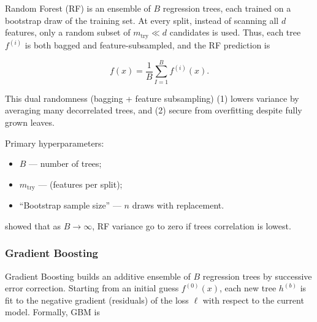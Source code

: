 Random Forest (RF) is an ensemble of \(B\) regression trees\cite{breimanRandomForests2001}, each trained on a bootstrap draw of the training set. At every split, instead of scanning all \(d\) features, only a random subset of \(m_{\mathrm{try}}\ll d\) candidates is used. Thus, each tree \(f^{(i)}\) is both bagged and feature-subsampled, and the RF prediction is

\begin{equation}
    f(x)
    =
    \frac{1}{B}\sum_{I=1}^B f^{(i)}(x).
\end{equation}

This dual randomness (bagging + feature subsampling) (1) lowers variance by averaging many decorrelated trees, and (2) secure from overfitting despite fully grown leaves.

Primary hyperparameters:
\begin{itemize}
    \item \(B\) --- number of trees;
    \item \(m_{\mathrm{try}}\) --- (features per split);
    \item ``Bootstrap sample size'' --- \(n\) draws with replacement.
\end{itemize}

\cite{breimanRandomForests2001} showed that as \(B \to \infty\), RF variance go to zero if trees correlation is lowest.


\subsubsection{Gradient Boosting}
\label{model:gradient-boosting}

Gradient Boosting \cite{friedmanGreedyFunctionApproximation2001} builds an additive ensemble of \(B\) regression trees by successive error correction. Starting from an initial guess \(f^{(0)}(x)\), each new tree \(h^{(b)}\) is fit to the negative gradient (residuals) of the loss \(\ell\) with respect to the current model. Formally, GBM is

